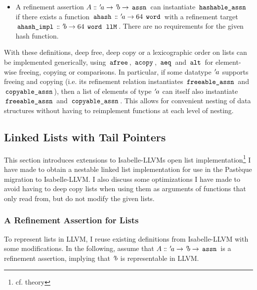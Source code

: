 \begin{itemize}
	      The Hoare-triple $\{A \app a \app ai \ast A \app b \app bi\}(\iexp{alt} \app ai \app bi)\{\lambda r. \uparrow(r = (a<b))\}$ must hold.
	\item A refinement assertion $A \mathrel{\mathord{:}\mkern-1.2mu\mathord{:}} {\mskip2mu '\mskip-2mua} \rightarrow {\mskip2mu '\mskip-2mub} \rightarrow \,\text{\ttfamily assn}\,$ can instantiate $\,\text{\ttfamily hashable\_assn}\,$ if there exists a function $\,\text{\ttfamily ahash}\, \mathrel{\mathord{:}\mkern-1.2mu\mathord{:}} {\mskip2mu '\mskip-2mua} \rightarrow 64 \; \,\text{\ttfamily word}\,$ with a refinement target $\,\text{\ttfamily ahash\_impl}\, \mathrel{\mathord{:}\mkern-1.2mu\mathord{:}} {\mskip2mu '\mskip-2mub} \rightarrow 64 \; \,\text{\ttfamily word}\, \; \,\text{\ttfamily llM}\,$.
	      There are no requirements for the given hash function.
\end{itemize}

With these definitions, deep free, deep copy or a lexicographic order on lists can be implemented generically, using $\,\text{\ttfamily afree}\,$, $\,\text{\ttfamily acopy}\,$, $\,\text{\ttfamily aeq}\,$ and $\,\text{\ttfamily alt}\,$ for element-wise freeing, copying or comparisons.
In particular, if some datatype ${\mskip2mu '\mskip-2mua}$ supports freeing and copying (i.e. its refinement relation instantiates $\,\text{\ttfamily freeable\_assn}\,$ and $\,\text{\ttfamily copyable\_assn}\,$), then a list of elements of type ${\mskip2mu '\mskip-2mua}$ can itself also instantiate $\,\text{\ttfamily freeable\_assn}\,$ and $\,\text{\ttfamily copyable\_assn}\,$.
This allows for convenient nesting of data structures without having to reimplement functions at each level of nesting.

\subsection{Linked Lists with Tail Pointers}\label{sec:lists-with-tail-pointers}

This section introduces extensions to Isabelle-LLVMs open list implementation\footnote{cf. theory } I have made to obtain a nestable linked list implementation for use in the Pastèque migration to Isabelle-LLVM.
I also discuss some optimizations I have made to avoid having to deep copy lists when using them as arguments of functions that only read from, but do not modify the given lists.

\subsubsection{A Refinement Assertion for Lists}\label{sec:refinement-assertion-for-lists}

To represent lists in LLVM, I reuse existing definitions from Isabelle-LLVM with some modifications.
In the following, assume that $A \mathrel{\mathord{:}\mkern-1.2mu\mathord{:}} {\mskip2mu '\mskip-2mua} \rightarrow {\mskip2mu '\mskip-2mub} \rightarrow \,\text{\ttfamily assn}\,$ is a refinement assertion, implying that ${\mskip2mu '\mskip-2mub}$ is representable in LLVM.

